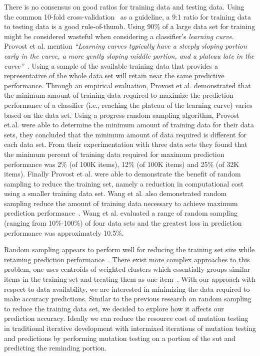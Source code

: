 There is no consensus on good ratios for training data and testing data. Using the common 10-fold cross-validation~\cite{Koh95} as a guideline, a 9:1 ratio for training data to testing data is a good rule-of-thumb. Using 90\% of a large data set for training might be considered wasteful when considering a classifier's \emph{learning curve}. Provost et al. mention \emph{``Learning curves typically have a steeply sloping portion early in the curve, a more gently sloping middle portion, and a plateau late in the curve''}~\cite{PJO99}. Using a sample of the available training data that provides a representative of the whole data set will retain near the same predictive performance. Through an empirical evaluation, Provost et al. demonstrated that the minimum amount of training data required to maximize the prediction performance of a classifier (i.e., reaching the plateau of the learning curve) varies based on the data set. Using a progress random sampling algorithm, Provost et.al. were able to determine the minimum amount of training data for their data sets, they concluded that the minimum amount of data required is different for each data set. From their experimentation with three data sets they found that the minimum percent of training data required for maximum prediction performance was 2\% (of 100K items), 12\% (of 100K items) and 25\% (of 32K items). Finally Provost et al. were able to demonstrate the benefit of random sampling to reduce the training set, namely a reduction in computational cost using a smaller training data set. Wang et al. also demonstrated random sampling reduce the amount of training data necessary to achieve maximum prediction performance~\cite{WNC05}. Wang et al. evaluated a range of random sampling (ranging from 10\%-100\%) of four data sets and the greatest loss in prediction performance was approximately 10.5\%. 

Random sampling appears to perform well for reducing the training set size while retaining prediction performance~\cite{PJO99, WNC05}. There exist more complex approaches to this problem, one uses centroids of weighted clusters which essentially groups similar items in the training set and treating them as one item~\cite{NBP08}. With our approach with respect to data availability, we are interested in minimizing the data required to make accuracy predictions. Similar to the previous research on random sampling to reduce the training data set, we decided to explore how it affects our prediction accuracy. Ideally we can reduce the resource cost of mutation testing in traditional iterative development with intermixed iterations of mutation testing and predictions by performing mutation testing on a portion of the \gls{sut} and predicting the reminding portion. 


